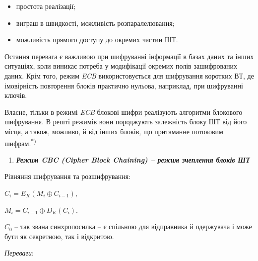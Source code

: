 \documentclass[a4paper]{article}
\newcommand\liststyleWWviiiNumxxi{%
\renewcommand\theenumi{\arabic{enumi}}
\renewcommand\theenumii{\arabic{enumii}}
\renewcommand\theenumiii{\arabic{enumiii}}
\renewcommand\theenumiv{\arabic{enumiv}}
\renewcommand\labelenumi{\theenumi.}
\renewcommand\labelenumii{\theenumii.}
\renewcommand\labelenumiii{\theenumiii.}
\renewcommand\labelenumiv{\theenumiv.}
}
\newcommand\liststyleWWviiiNumliv{%
\renewcommand\labelitemi{\textlatin{[F0B7?]}}
\renewcommand\labelitemii{o}
\renewcommand\labelitemiii{\textlatin{[F0A7?]}}
\renewcommand\labelitemiv{\textlatin{[F0B7?]}}
}
\newcounter{}
\begin{document}
\liststyleWWviiiNumliv
\begin{itemize}
\item простота реалізації;
\item виграш в швидкості, можливість розпаралелювання;
\item можливість прямого доступу до окремих частин ШТ.
\end{itemize}
Остання перевага є важливою при шифруванні інформації в базах даних та інших
ситуаціях, коли виникає потреба у модифікації окремих полів зашифрованих даних.
Крім того, режим \textit{ECB} використовується для шифрування коротких ВТ, де
імовірність повторення блоків практично нульова, наприклад, при шифруванні
ключів.

Власне, тільки в режимі \textit{ECB }блокові шифри реалізують алгоритми
блокового шифрування. В решті режимів  вони породжують залежність блоку ШТ від
його місця, а також, можливо, й від інших блоків, що притаманне потоковим
шифрам.\textsuperscript{*)}


\bigskip


\bigskip

\liststyleWWviiiNumxxi
\begin{enumerate}
\item {\bfseries\itshape
Режим CBC (Cipher Block Chaining) – режим зчеплення блоків ШТ}
\end{enumerate}

\bigskip

Рівняння шифрування та розшифрування:

{\centering
 ${C_{{i}}=E_{{K}}(M_{{i}}{\oplus}C_{{i-1}})}$,
\par}

{\centering
 ${M_{{i}}=C_{{i-1}}{\oplus}D_{{K}}(C_{{i}})}$.
\par}

 ${C_{{0}}}$ – так звана синхропосилка – є спільною для відправника й одержувача
і може бути як секретною, так і відкритою.


\bigskip

\textit{Переваги}:
\end{document}
